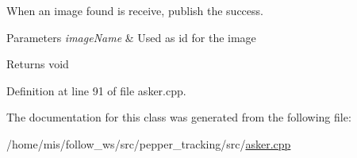 When an image found is receive, publish the success. 


\begin{DoxyParams}{Parameters}
{\em image\+Name} & Used as id for the image \\
\hline
\end{DoxyParams}
\begin{DoxyReturn}{Returns}
void 
\end{DoxyReturn}


Definition at line 91 of file asker.\+cpp.



The documentation for this class was generated from the following file\+:\begin{DoxyCompactItemize}
\item 
/home/mis/follow\+\_\+ws/src/pepper\+\_\+tracking/src/\hyperlink{asker_8cpp}{asker.\+cpp}\end{DoxyCompactItemize}
